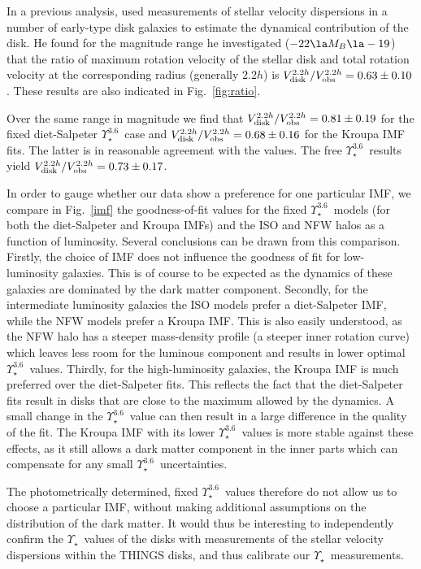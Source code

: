 \documentclass[usenatbib,usegraphicx,apjfonts,floatfix]{emulateapj}
\newcommand{\MLstar}{\ensuremath{\Upsilon_{\star}}}
\newcommand{\Ups}{\ensuremath{\Upsilon_{\star}^{3.6}}}
\begin{document}
In a previous analysis, \citet{botje97} used measurements of stellar
velocity dispersions in a number of early-type disk galaxies to
estimate the dynamical contribution of the disk.  He found for the
magnitude range he investigated ($-22 \la M_B \la -19$) that the ratio
of maximum rotation velocity of the stellar disk and total rotation
velocity at the corresponding radius (generally $2.2h$) is $V_{\rm
  disk}^{2.2h}/V_{\rm obs}^{2.2h} = 0.63 \pm 0.10$. These results are
also indicated in Fig.~\ref{fig:ratio}.  

Over the same range in magnitude we find that $V_{\rm
  disk}^{2.2h}/V_{\rm obs}^{2.2h} = 0.81 \pm 0.19$ for the fixed
diet-Salpeter \Ups\ case and $V_{\rm disk}^{2.2h}/V_{\rm obs}^{2.2h} =
0.68 \pm 0.16$ for the Kroupa IMF fits.  The latter is in reasonable
agreement with the \citet{botje97} values. The free \Ups\ results
yield $V_{\rm disk}^{2.2h}/V_{\rm obs}^{2.2h} = 0.73 \pm 0.17$.

In order to gauge whether our data show a preference for one
particular IMF, we compare in Fig.~\ref{imf} the goodness-of-fit
values for the fixed \Ups\ models (for both the diet-Salpeter and
Kroupa IMFs) and the ISO and NFW halos as a function of luminosity.
Several conclusions can be drawn from this comparison. Firstly, the
choice of IMF does not influence the goodness of fit for
low-luminosity galaxies. This is of course to be expected as the
dynamics of these galaxies are dominated by the dark matter
component. Secondly, for the intermediate luminosity galaxies the ISO
models prefer a diet-Salpeter IMF, while the NFW models prefer a
Kroupa IMF.  This is also easily understood, as the NFW halo has a
steeper mass-density profile (a steeper inner rotation curve) which
leaves less room for the luminous component and  results in
lower optimal \Ups\ values.  Thirdly, for the high-luminosity
galaxies, the Kroupa IMF is much preferred over the diet-Salpeter
fits. This reflects the fact that the diet-Salpeter fits result in
disks that are close to the maximum allowed by the dynamics. A small
change in the \Ups\ value can then result in a large difference in the
quality of the fit. The Kroupa IMF with its lower \Ups\ values is more
stable against these effects, as it still allows a dark matter
component in the inner parts which can compensate for any small \Ups\
uncertainties.

The photometrically determined, fixed \Ups\ values therefore do not
allow us to choose a particular IMF, without making additional
assumptions on the distribution of the dark matter.  It would thus be
interesting to independently confirm the \MLstar\ values of the disks
with measurements of the stellar velocity dispersions within the
THINGS disks, and thus calibrate our \MLstar\ measurements.
\end{document}
